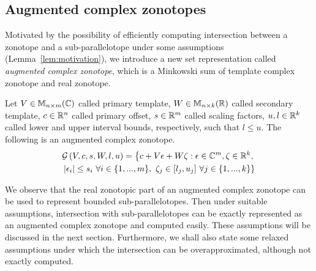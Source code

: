 \subsection{Augmented complex zonotopes}
Motivated by the possibility of efficiently computing intersection
between a zonotope and a sub-parallelotope under some assumptions
(Lemma~\ref{lem:motivation}), we introduce a new set representation
called \emph{augmented complex zonotope}, which is a Minkowski sum of
template complex zonotope and real zonotope.

\begin{definition}
Let $V\in\mathbb{M}_{n\times m}(\mathbb{C})$ called primary template, $W\in\mathbb{M}_{n\times k}(\mathbb{R})$
called secondary template, $c\in\mathbb{R}^n$ called primary offset,
$s\in\mathbb{R}^m$ called scaling factors, $u,l\in\mathbb{R}^k$ called lower
and upper interval bounds, respectively, such that $l\leq u$.  The
following is an augmented complex
zonotope.
\begin{multline}
\mathcal{G}\left(V,c,s,W,l,u\right) =
\left\{
  c+V\epsilon+W\zeta:\epsilon\in\mathbb{C}^m,\zeta\in\mathbb{R}^k,\right.\\ \left.  \left|\epsilon_i\right|\leq
 s_i~\forall i\in\{1,...,m\},~\zeta_j\in[l_j,u_j]~\forall j\in \{1,...,k\}
\right\}
\end{multline}
\end{definition}

We observe that the real zonotopic part of an augmented complex
zonotope can be used to represent bounded sub-parallelotopes.  Then
under suitable assumptions, intersection with sub-parallelotopes can
be exactly represented as an augmented complex zonotope and computed
easily.  These assumptions will be discussed in the next section.
Furthermore, we shall also state some relaxed assumptions under which
the intersection can be overapproximated, although not exactly
computed.



